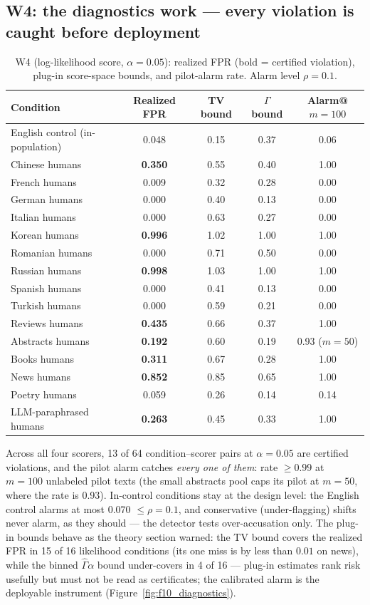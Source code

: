 \documentclass[11pt]{article}
\begin{document}
\subsection{W4: the diagnostics work --- every violation is caught before deployment}\label{sec:w4}
\begin{table}[H]\centering
\caption{W4 (log-likelihood score, $\alpha=0.05$): realized FPR (bold = certified violation), plug-in score-space bounds, and pilot-alarm rate. Alarm level $\rho=0.1$.}
\label{tab:w4}
\small
\begin{tabular}{lcccc}
\toprule
Condition & Realized FPR & TV bound & $\Gamma$ bound & Alarm@$m{=}100$ \\
\midrule
English control (in-population) & 0.048 & 0.15 & 0.37 & 0.06 \\
Chinese humans & \textbf{0.350} & 0.55 & 0.40 & 1.00 \\
French humans & 0.009 & 0.32 & 0.28 & 0.00 \\
German humans & 0.000 & 0.40 & 0.13 & 0.00 \\
Italian humans & 0.000 & 0.63 & 0.27 & 0.00 \\
Korean humans & \textbf{0.996} & 1.02 & 1.00 & 1.00 \\
Romanian humans & 0.000 & 0.71 & 0.50 & 0.00 \\
Russian humans & \textbf{0.998} & 1.03 & 1.00 & 1.00 \\
Spanish humans & 0.000 & 0.41 & 0.13 & 0.00 \\
Turkish humans & 0.000 & 0.59 & 0.21 & 0.00 \\
Reviews humans & \textbf{0.435} & 0.66 & 0.37 & 1.00 \\
Abstracts humans & \textbf{0.192} & 0.60 & 0.19 & 0.93 ($m{=}50$) \\
Books humans & \textbf{0.311} & 0.67 & 0.28 & 1.00 \\
News humans & \textbf{0.852} & 0.85 & 0.65 & 1.00 \\
Poetry humans & 0.059 & 0.26 & 0.14 & 0.14 \\
LLM-paraphrased humans & \textbf{0.263} & 0.45 & 0.33 & 1.00 \\
\bottomrule
\end{tabular}
\end{table}
Across all four scorers, 13 of 64 condition--scorer pairs at $\alpha=0.05$ are certified violations, and the pilot alarm catches \emph{every one of them}: rate $\ge0.99$ at $m=100$ unlabeled pilot texts (the small abstracts pool caps its pilot at $m=50$, where the rate is 0.93). In-control conditions stay at the design level: the English control alarms at most 0.070 $\le \rho=0.1$, and conservative (under-flagging) shifts never alarm, as they should --- the detector tests over-accusation only. The plug-in bounds behave as the theory section warned: the TV bound covers the realized FPR in 15 of 16 likelihood conditions (its one miss is by less than $0.01$ on news), while the binned $\widehat\Gamma\alpha$ bound under-covers in 4 of 16 --- plug-in estimates rank risk usefully but must not be read as certificates; the calibrated alarm is the deployable instrument (Figure~\ref{fig:f10_diagnostics}).
\end{document}
